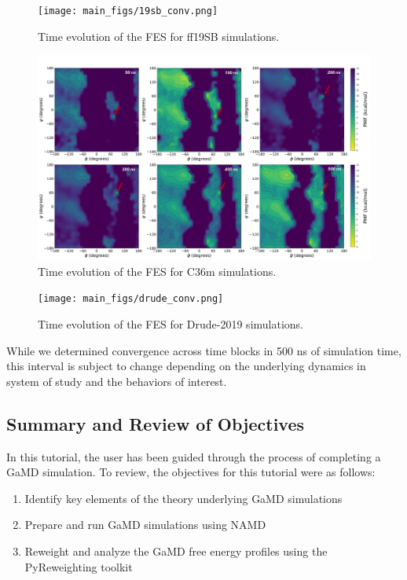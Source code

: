 \documentclass[9pt,tutorial,pubversion]{livecoms}
\begin{document}
\begin{figure}
    \texttt{[image: main\_figs/19sb\_conv.png]}
    \caption{Time evolution of the FES for ff19SB simulations.}
    \label{fig:19sb_conv}
\end{figure}

\begin{figure}
    \includegraphics[scale=0.62]{main_figs/c36_conv.png}
    \caption{Time evolution of the FES for C36m simulations.}
    \label{fig:c36_conv}
\end{figure}

\begin{figure}[h]
    \texttt{[image: main\_figs/drude\_conv.png]}
    \caption{Time evolution of the FES for Drude-2019 simulations.}
    \label{fig:drude_conv}
\end{figure}

While we determined convergence across time blocks in 500 ns of simulation time, this interval is subject to change depending on the underlying dynamics in system of study and the behaviors of interest.

\subsection{Summary and Review of Objectives}
In this tutorial, the user has been guided through the process of completing a GaMD simulation. To review, the objectives for this tutorial were as follows: 

\begin{enumerate}
    \item Identify key elements of the theory underlying GaMD simulations
    \item Prepare and run GaMD simulations using NAMD
    \item Reweight and analyze the GaMD free energy profiles using the PyReweighting toolkit
\end{enumerate}
\end{document}
